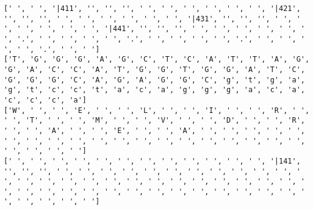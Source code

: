 \documentclass{article}
\begin{document}
\begin{Verbatim}
[' ', ' ', '|411', '', '', '', ' ', ' ', ' ', ' ', ' ', ' ', '|421', '', '', '', ' ', ' ', ' ', ' ', ' ', ' ', '|431', '', '', '', ' ', ' ', ' ', ' ', ' ', ' ', '|441', '', '', '', ' ', ' ', ' ', ' ', ' ', ' ', '.', ' ', ' ', ' ', ' ', '.', ' ', ' ', ' ', ' ', '.', ' ', ' ', ' ', ' ', '.', ' ', ' ']
['T', 'G', 'G', 'G', 'A', 'G', 'C', 'T', 'C', 'A', 'T', 'T', 'A', 'G', 'G', 'A', 'C', 'C', 'A', 'T', 'G', 'G', 'T', 'G', 'G', 'A', 'T', 'C', 'G', 'G', 'G', 'C', 'A', 'G', 'A', 'G', 'G', 'C', 'g', 't', 'g', 'a', 'g', 't', 'c', 'c', 't', 'a', 'c', 'a', 'g', 'g', 'g', 'a', 'c', 'a', 'c', 'c', 'c', 'a']
['W', ' ', ' ', 'E', ' ', ' ', 'L', ' ', ' ', 'I', ' ', ' ', 'R', ' ', ' ', 'T', ' ', ' ', 'M', ' ', ' ', 'V', ' ', ' ', 'D', ' ', ' ', 'R', ' ', ' ', 'A', ' ', ' ', 'E', ' ', ' ', 'A', ' ', ' ', ' ', ' ', ' ', ' ', ' ', ' ', ' ', ' ', ' ', ' ', ' ', ' ', ' ', ' ', ' ', ' ', ' ', ' ', ' ', ' ', ' ']
[' ', ' ', ' ', ' ', ' ', ' ', ' ', ' ', ' ', ' ', ' ', ' ', '|141', '', '', '', ' ', ' ', ' ', ' ', ' ', ' ', ' ', ' ', ' ', ' ', ' ', ' ', ' ', ' ', ' ', ' ', ' ', ' ', ' ', ' ', ' ', ' ', ' ', ' ', ' ', ' ', ' ', ' ', ' ', ' ', ' ', ' ', ' ', ' ', ' ', ' ', ' ', ' ', ' ', ' ', ' ', ' ', ' ', ' ']
  

\end{Verbatim}
\end{document}
